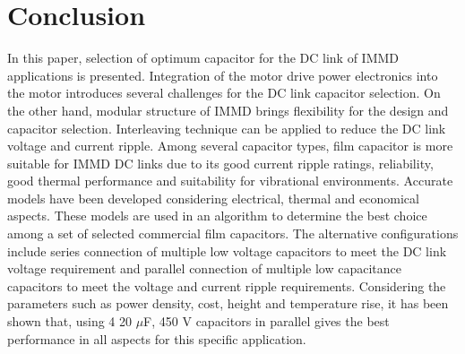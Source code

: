 \documentclass[conference,a4paper,twocolumn]{IEEEtran}
\begin{document}
\section{Conclusion}

In this paper, selection of optimum capacitor for the DC link of IMMD applications is presented. Integration of the motor drive power electronics into the motor introduces several challenges for the DC link capacitor selection. On the other hand, modular structure of IMMD brings flexibility for the design and capacitor selection. Interleaving technique can be applied to reduce the DC link voltage and current ripple. Among several capacitor types, film capacitor is more suitable for IMMD DC links due to its good current ripple ratings, reliability, good thermal performance and suitability for vibrational environments. Accurate models have been developed considering electrical, thermal and economical aspects. These models are used in an algorithm to determine the best choice among a set of selected commercial film capacitors. The alternative configurations include series connection of multiple low voltage capacitors to meet the DC link voltage requirement and parallel connection of multiple low capacitance capacitors to meet the voltage and current ripple requirements. Considering the parameters such as power density, cost, height and temperature rise, it has been shown that, using 4 20 $\mu$F, 450 V capacitors in parallel gives the best performance in all aspects for this specific application.




\end{document}
